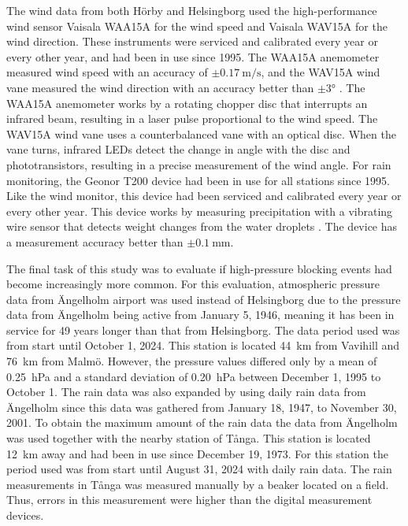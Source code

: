 The wind data from both Hörby and Helsingborg used the high-performance wind sensor Vaisala WAA15A for the wind speed and Vaisala WAV15A for the wind direction. These instruments were serviced and calibrated every year or every other year, and had been in use since 1995. The WAA15A anemometer measured wind speed with an accuracy of $\pm\SI{0.17}{\m\per\s}$, and the WAV15A wind vane measured the wind direction with an accuracy better than $\pm\ang{3}$ \cite{vaisalaWindSetWA152021}. The WAA15A anemometer works by a rotating chopper disc that interrupts an infrared beam, resulting in a laser pulse proportional to the wind speed. The WAV15A wind vane uses a counterbalanced vane with an optical disc. When the vane turns, infrared LEDs detect the change in angle with the disc and phototransistors, resulting in a precise measurement of the wind angle. For rain monitoring, the Geonor T200 device had been in use for all stations since 1995. Like the wind monitor, this device had been serviced and calibrated every year or every other year. This device works by measuring precipitation with a vibrating wire sensor that detects weight changes from the water droplets \cite{geonorinc.T200BSeriesAll2019}. The device has a measurement accuracy better than $\pm\SI{0.1}{\mm}$. 

The final task of this study was to evaluate if high-pressure blocking events had become increasingly more common. For this evaluation, atmospheric pressure data from Ängelholm airport was used instead of Helsingborg due to the pressure data from Ängelholm being active from January 5, 1946, meaning it has been in service for 49 years longer than that from Helsingborg. The data period used was from start until October 1, 2024. This station is located \SI{44}{\km} from Vavihill and \SI{76}{\km} from Malmö. However, the pressure values differed only by a mean of \SI{0.25}{\hecto\pascal} and a standard deviation of \SI{0.20}{\hecto\pascal} between December 1, 1995 to October 1. The rain data was also expanded by using daily rain data from Ängelholm since this data was gathered from January 18, 1947, to November 30, 2001. To obtain the maximum amount of the rain data the data from Ängelholm was used together with the nearby station of Tånga. This station is located \SI{12}{\km} away and had been in use since December 19, 1973. For this station the period used was from start until August 31, 2024 with daily rain data. The rain measurements in Tånga was measured manually by a beaker located on a field. Thus, errors in this measurement were higher than the digital measurement devices. 

